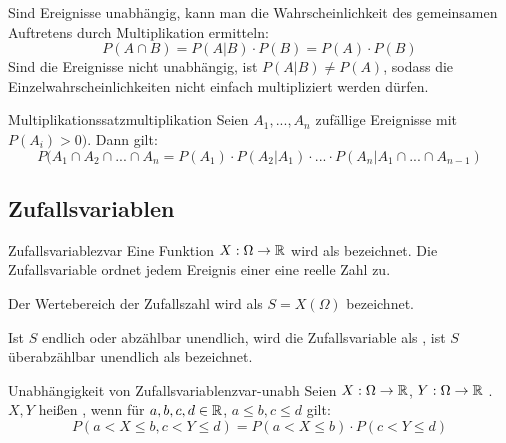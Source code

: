 Sind Ereignisse unabhängig, kann man die Wahrscheinlichkeit des gemeinsamen
Auftretens durch Multiplikation ermitteln:
\[P(A\cap B) = P(A|B)\cdot P(B) = P(A)\cdot P(B)\]
Sind die Ereignisse nicht unabhängig, ist $P(A|B) \ne P(A)$, sodass die
Einzelwahrscheinlichkeiten nicht einfach multipliziert werden dürfen.

\begin{theorem}{Multiplikationssatz}{multiplikation}
Seien $A_1, ...,A_n$ zufällige Ereignisse mit $P(A_i) > 0)$. Dann gilt:
\[P(A_1\cap A_2\cap ...\cap A_n = P(A_1)\cdot P(A_2|A_1) \cdot ...\cdot
P(A_n|A_1\cap ...\cap A_{n-1})\]
\end{theorem}


\subsection{Zufallsvariablen}

\begin{definition}{Zufallsvariable}{zvar}
Eine Funktion $X: \Omega \to \mathbb{R}$ wird als 
bezeichnet. Die Zufallsvariable ordnet jedem Ereignis einer
 eine reelle Zahl zu.

Der Wertebereich der Zufallszahl wird als  $S = X(\Omega)$
bezeichnet.

Ist $S$ endlich oder abzählbar unendlich, wird die Zufallsvariable als
, ist $S$ überabzählbar unendlich als  bezeichnet.
\end{definition}

\begin{definition}{Unabhängigkeit von Zufallsvariablen}{zvar-unabh}
Seien $X: \Omega \to \mathbb{R}$, $Y: \Omega \to \mathbb{R}$ . $X,
Y$ heißen , wenn für $a,b,c,d \in \mathbb{R}$, $a\le b, c\le d$ gilt:
\[P(a < X\le b,c<Y\le d) = P(a<X\le b)\cdot P(c<Y\le d)\]
\end{definition}

